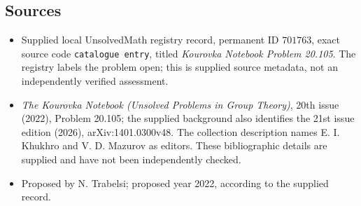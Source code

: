 \documentclass[11pt]{article}
\begin{document}
\subsection{Sources}
\begin{itemize}
\item Supplied local UnsolvedMath registry record, permanent ID \(701763\), exact source code \texttt{catalogue entry}, titled \emph{Kourovka Notebook Problem 20.105}. The registry labels the problem open; this is supplied source metadata, not an independently verified assessment.
\item \emph{The Kourovka Notebook (Unsolved Problems in Group Theory)}, 20th issue (2022), Problem 20.105; the supplied background also identifies the 21st issue edition (2026), arXiv:1401.0300v48. The collection description names E. I. Khukhro and V. D. Mazurov as editors. These bibliographic details are supplied and have not been independently checked.
\item Proposed by N. Trabelsi; proposed year 2022, according to the supplied record.
\end{itemize}
\end{document}
